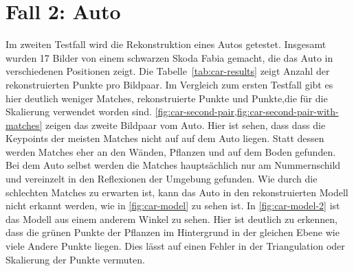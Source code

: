 \section{Fall 2: Auto}
\label{sec:textcase-car}
Im zweiten Testfall wird die Rekonstruktion eines Autos getestet. 
Insgesamt wurden 17 Bilder von einem schwarzen Skoda Fabia gemacht, die das Auto in verschiedenen Positionen zeigt.
Die Tabelle~\cref{tab:car-results} zeigt Anzahl der rekonstruierten Punkte pro Bildpaar.
Im Vergleich zum ersten Testfall gibt es hier deutlich weniger Matches, rekonstruierte Punkte und Punkte,die für die Skalierung verwendet worden sind.
\cref{fig:car-second-pair,fig:car-second-pair-with-matches} zeigen das zweite Bildpaar vom Auto.
Hier ist sehen, dass dass die Keypoints der meisten Matches nicht auf auf dem Auto liegen.
Statt dessen werden Matches eher an den Wänden, Pflanzen und auf dem Boden gefunden.
Bei dem Auto selbst werden die Matches hauptsächlich nur am Nummernschild und vereinzelt in den Reflexionen der Umgebung gefunden.
Wie durch die schlechten Matches zu erwarten ist, kann das Auto in den rekonstruierten Modell nicht erkannt werden, wie in \cref{fig:car-model} zu sehen ist.
In \cref{fig:car-model-2} ist das Modell aus einem anderem Winkel zu sehen.
Hier ist deutlich zu erkennen, dass die grünen Punkte der Pflanzen im Hintergrund in der gleichen Ebene wie viele Andere Punkte liegen. 
Dies lässt auf einen Fehler in der Triangulation oder Skalierung der Punkte vermuten.

